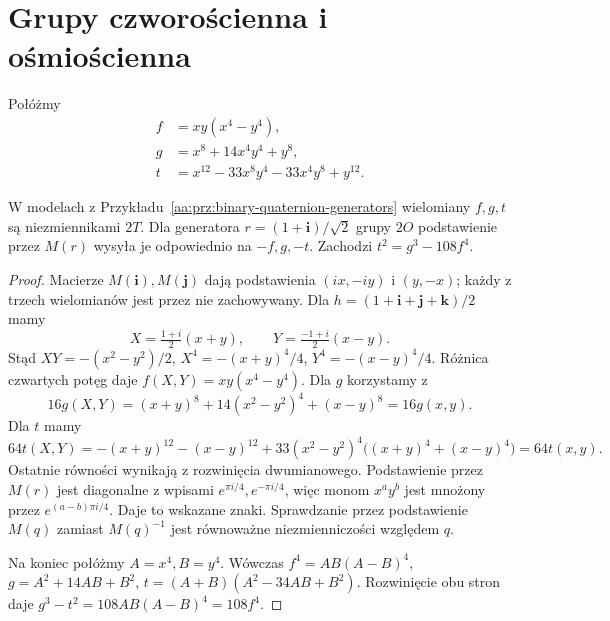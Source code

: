 \section{Grupy czworościenna i ośmiościenna}

Połóżmy
\[
\begin{aligned}
 f&=xy(x^4-y^4),\\
 g&=x^8+14x^4y^4+y^8,\\
 t&=x^{12}-33x^8y^4-33x^4y^8+y^{12}.
\end{aligned}
\]

\begin{lemat}
\label{aa:lem:exceptional-small-forms}
W modelach z Przykładu~\ref{aa:prz:binary-quaternion-generators}
wielomiany $f,g,t$ są niezmiennikami $2T$.
Dla generatora $r=(1+\mathbf i)/\sqrt2$ grupy $2O$
podstawienie przez $M(r)$ wysyła je odpowiednio
na $-f,g,-t$. Zachodzi $t^2=g^3-108f^4$.
\end{lemat}
\begin{proof}
Macierze $M(\mathbf i),M(\mathbf j)$ dają
podstawienia $(ix,-iy)$ i $(y,-x)$; każdy z trzech
wielomianów jest przez nie zachowywany.
Dla $h=(1+\mathbf i+\mathbf j+\mathbf k)/2$ mamy
\[
 X=\tfrac{1+i}{2}(x+y),\qquad
 Y=\tfrac{-1+i}{2}(x-y).
\]
Stąd $XY=-(x^2-y^2)/2$,
$X^4=-(x+y)^4/4$, $Y^4=-(x-y)^4/4$.
Różnica czwartych potęg daje
$f(X,Y)=xy(x^4-y^4)$. Dla $g$ korzystamy z
\[
 16g(X,Y)=(x+y)^8+14(x^2-y^2)^4+(x-y)^8
          =16g(x,y).
\]
Dla $t$ mamy
\[
 64t(X,Y)=-(x+y)^{12}-(x-y)^{12}
 +33(x^2-y^2)^4\big((x+y)^4+(x-y)^4\big)
 =64t(x,y).
\]
Ostatnie równości wynikają z rozwinięcia dwumianowego.
Podstawienie przez $M(r)$ jest diagonalne z wpisami
$e^{\pi i/4},e^{-\pi i/4}$, więc monom $x^ay^b$
jest mnożony przez $e^{(a-b)\pi i/4}$. Daje to
wskazane znaki. Sprawdzanie przez podstawienie $M(q)$
zamiast $M(q)^{-1}$ jest równoważne niezmienniczości
względem $q$.

Na koniec połóżmy $A=x^4,B=y^4$.
Wówczas $f^4=AB(A-B)^4$,
$g=A^2+14AB+B^2$, $t=(A+B)(A^2-34AB+B^2)$.
Rozwinięcie obu stron daje
$g^3-t^2=108AB(A-B)^4=108f^4$.
\end{proof}

